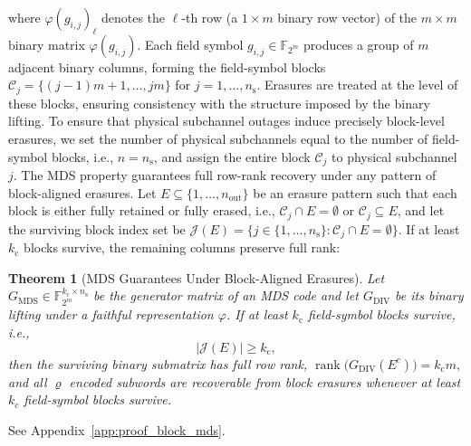 \documentclass[journal]{IEEEtran}
\newtheorem{theorem}{Theorem}
\begin{document}
where $\varphi(g_{i,j})_\ell$ denotes the $\ell$-th row 
(a $1 \times m$ binary row vector) of the $m \times m$ binary 
matrix $\varphi(g_{i,j})$. Each field symbol $g_{i,j} \in \mathbb{F}_{2^m}$ produces a group 
of $m$ adjacent binary columns, forming the field-symbol blocks 
$\mathcal{C}_j = \{(j-1)m+1,\ldots,jm\}$ for $j = 1,\ldots,n_{\mathrm{s}}$. 
Erasures are treated at the level of these blocks, ensuring 
consistency with the structure imposed by the binary lifting. To 
ensure that physical subchannel outages induce precisely block-level 
erasures, we set the number of physical subchannels equal to the 
number of field-symbol blocks, i.e., $n = n_{\mathrm{s}}$, and 
assign the entire block $\mathcal{C}_j$ to physical subchannel $j$. 
The MDS property guarantees full row-rank recovery under any pattern 
of block-aligned erasures. Let $E \subseteq \{1,\ldots,n_{\text{out}}\}$ 
be an erasure pattern such that each block is either fully retained 
or fully erased, i.e., $\mathcal{C}_j \cap E = \emptyset$ or 
$\mathcal{C}_j \subseteq E$, and let the surviving block index set be 
$\mathcal{J}(E) = \{ j \in \{1,\ldots,n_{\mathrm{s}}\} : 
\mathcal{C}_j \cap E = \emptyset \}$. 
If at least $k_{\mathrm{c}}$ blocks survive, the remaining columns 
preserve full rank:

\begin{theorem}[MDS Guarantees Under Block-Aligned Erasures]
\label{thm:block_mds}
Let $G_{\mathrm{MDS}} \in 
\mathbb{F}_{2^m}^{k_{\mathrm{c}} \times n_{\mathrm{s}}}$ be the 
generator matrix of an MDS code and let $G_{\mathrm{DIV}}$ be its 
binary lifting under a faithful representation $\varphi$. If at 
least $k_{\mathrm{c}}$ field-symbol blocks survive, i.e.,
\[
|\mathcal{J}(E)| \geq k_{\mathrm{c}},
\]
then the surviving binary submatrix has full row rank,
$\operatorname{rank}\bigl(G_{\mathrm{DIV}}(E^c)\bigr)=k_{\mathrm{c}} m,
$ and all $\varrho$ encoded subwords are recoverable from block erasures whenever at least $k_c$ field-symbol blocks survive.
\end{theorem}

\begin{IEEEproof}
See Appendix~\ref{app:proof_block_mds}.
\end{IEEEproof}
\end{document}
